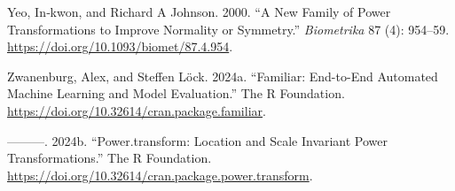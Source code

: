 \documentclass[
  a4paper,
]{article}
\newlength{\cslhangindent}
\newenvironment{CSLReferences}[2] %
 {\begin{list}{}{%
  \setlength{\itemindent}{0pt}
  \setlength{\leftmargin}{0pt}
  \setlength{\parsep}{0pt}
  \ifodd #1
   \setlength{\leftmargin}{\cslhangindent}
   \setlength{\itemindent}{-1\cslhangindent}
  \fi
  \setlength{\itemsep}{#2\baselineskip}}}
 {\end{list}}
\begin{document}
\begin{CSLReferences}{1}{0}
Yeo, In‐kwon, and Richard A Johnson. 2000. {``A New Family of Power
Transformations to Improve Normality or Symmetry.''} \emph{Biometrika}
87 (4): 954--59. \url{https://doi.org/10.1093/biomet/87.4.954}.

Zwanenburg, Alex, and Steffen Löck. 2024a. {``Familiar: End-to-End
Automated Machine Learning and Model Evaluation.''} The R Foundation.
\url{https://doi.org/10.32614/cran.package.familiar}.

---------. 2024b. {``Power.transform: Location and Scale Invariant Power
Transformations.''} The R Foundation.
\url{https://doi.org/10.32614/cran.package.power.transform}.

\end{CSLReferences}
\end{document}
